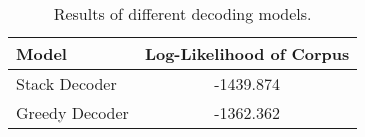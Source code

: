 \documentclass[11pt,letterpaper]{article}
\begin{document}
\begin{table}
\begin{center}
\begin{tabular}{|l||c|}
\hline
Model & Log-Likelihood of Corpus \\ \hline\hline
Stack Decoder & -1439.874 \\ \hline
Greedy Decoder & -1362.362 \\ \hline
\end{tabular}
\end{center}
\caption{\label{results} Results of different decoding models.}
\end{table}



\end{document}
